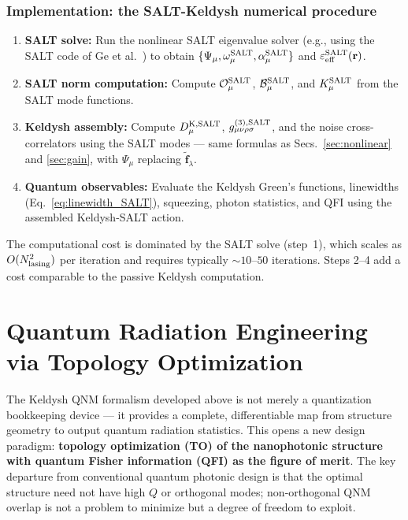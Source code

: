 \documentclass[12pt]{article}
\newcommand{\Keldysh}{{\rm K}}
\newcommand{\tf}{\tilde{\mathbf{f}}}
\begin{document}
\subsubsection*{Implementation: the SALT-Keldysh numerical procedure}

\begin{enumerate}
  \item \textbf{SALT solve:} Run the nonlinear SALT eigenvalue solver
    (e.g., using the SALT code of Ge et al.\ \cite{Ge2010}) to obtain
    $\{\Psi_\mu, \omega_\mu^{\rm SALT}, \alpha_\mu^{\rm SALT}\}$ and
    $\varepsilon_{\rm eff}^{\rm SALT}(\mathbf{r})$.

  \item \textbf{SALT norm computation:} Compute
    $\mathcal{O}_\mu^{\rm SALT}$, $\mathcal{B}_\mu^{\rm SALT}$, and
    $K_\mu^{\rm SALT}$ from the SALT mode functions.

  \item \textbf{Keldysh assembly:} Compute $D^{\Keldysh,\rm SALT}_\mu$,
    $g^{(3),\rm SALT}_{\mu\nu\rho\sigma}$, and the noise cross-correlators
    using the SALT modes --- same formulas as Secs.~\ref{sec:nonlinear}
    and \ref{sec:gain}, with $\Psi_\mu$ replacing $\tf_\lambda$.

  \item \textbf{Quantum observables:} Evaluate the Keldysh Green's
    functions, linewidths (Eq.~\ref{eq:linewidth_SALT}), squeezing,
    photon statistics, and QFI using the assembled Keldysh-SALT action.
\end{enumerate}

The computational cost is dominated by the SALT solve (step~1), which
scales as $O(N_{\rm lasing}^2)$ per iteration and requires typically
$\sim 10$--$50$ iterations.  Steps 2--4 add a cost comparable to the
passive Keldysh computation.


\section{Quantum Radiation Engineering via Topology Optimization}
\label{sec:topopt}

The Keldysh QNM formalism developed above is not merely a quantization
bookkeeping device --- it provides a complete, differentiable map from
structure geometry to output quantum radiation statistics.  This opens
a new design paradigm: \textbf{topology optimization (TO) of the
nanophotonic structure with quantum Fisher information (QFI) as the
figure of merit}.  The key departure from conventional quantum photonic
design is that the optimal structure need not have high $Q$ or
orthogonal modes; non-orthogonal QNM overlap is not a problem to
minimize but a degree of freedom to exploit.
\end{document}
